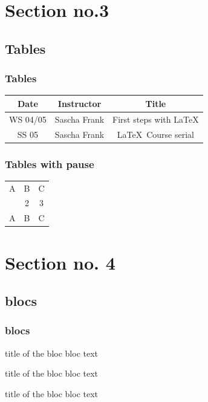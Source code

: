 \documentclass[11pt]{beamer}
\begin{document}
    \section{Section no.3}
    \subsection{Tables}
    \begin{frame}\frametitle{Tables}
        \begin{tabular}{|c|c|c|}
            \hline
            \textbf{Date} & \textbf{Instructor} & \textbf{Title} \\
            \hline
            WS 04/05 & Sascha Frank & First steps with  \LaTeX  \\
            \hline
            SS 05 & Sascha Frank & \LaTeX \ Course serial \\
            \hline
        \end{tabular}
    \end{frame}


    \begin{frame}\frametitle{Tables with pause}
        \begin{tabular}{c c c}
            A & B & C \\
            \pause
            1 & 2 & 3 \\
            \pause
            A & B & C \\
        \end{tabular}
    \end{frame}


    \section{Section no. 4}
    \subsection{blocs}
    \begin{frame}\frametitle{blocs}

        \begin{block}{title of the bloc}
            bloc text
        \end{block}

        \begin{exampleblock}{title of the bloc}
            bloc text
        \end{exampleblock}


        \begin{alertblock}{title of the bloc}
            bloc text
        \end{alertblock}
    \end{frame}
\end{document}

